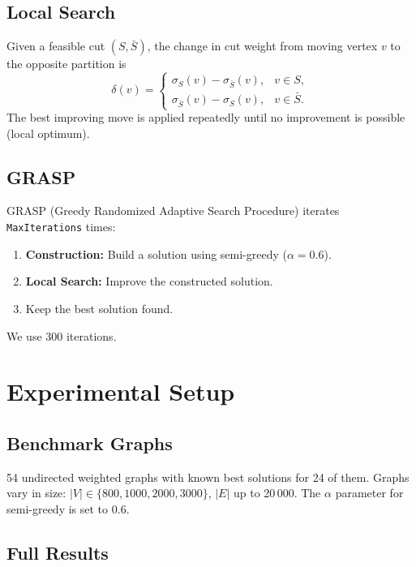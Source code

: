 \documentclass[12pt,a4paper]{article}
\begin{document}
\subsection{Local Search}
Given a feasible cut $(S, \bar{S})$, the change in cut weight from moving
vertex $v$ to the opposite partition is
\[
\delta(v) =
\begin{cases}
\sigma_S(v) - \sigma_{\bar{S}}(v), & v \in S,\\[2pt]
\sigma_{\bar{S}}(v) - \sigma_S(v), & v \in \bar{S}.
\end{cases}
\]
The best improving move is applied repeatedly until no improvement is
possible (local optimum).

\subsection{GRASP}
GRASP (Greedy Randomized Adaptive Search Procedure) iterates
\texttt{MaxIterations} times:
\begin{enumerate}
  \item {\bf Construction:} Build a solution using semi-greedy ($\alpha = 0.6$).
  \item {\bf Local Search:} Improve the constructed solution.
  \item Keep the best solution found.
\end{enumerate}
We use 300 iterations.

\section{Experimental Setup}

\subsection{Benchmark Graphs}
54 undirected weighted graphs with known best solutions for 24 of them.
Graphs vary in size: $|V| \in \{800, 1000, 2000, 3000\}$, $|E|$ up to
20\,000. The $\alpha$ parameter for semi-greedy is set to $0.6$.

\subsection{Full Results}
\end{document}
